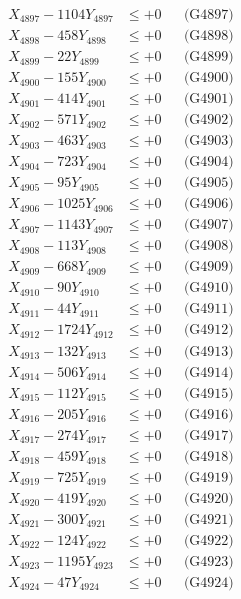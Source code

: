 \documentclass[a4paper,10pt]{article}
\begin{document}
{\begin{align}
X_{4897} - 1104Y_{4897} &\leq +0 && \text{(G4897)} \\
X_{4898} - 458Y_{4898} &\leq +0 && \text{(G4898)} \\
X_{4899} - 22Y_{4899} &\leq +0 && \text{(G4899)} \\
X_{4900} - 155Y_{4900} &\leq +0 && \text{(G4900)} \\
\allowbreak
X_{4901} - 414Y_{4901} &\leq +0 && \text{(G4901)} \\
X_{4902} - 571Y_{4902} &\leq +0 && \text{(G4902)} \\
X_{4903} - 463Y_{4903} &\leq +0 && \text{(G4903)} \\
X_{4904} - 723Y_{4904} &\leq +0 && \text{(G4904)} \\
X_{4905} - 95Y_{4905} &\leq +0 && \text{(G4905)} \\
X_{4906} - 1025Y_{4906} &\leq +0 && \text{(G4906)} \\
X_{4907} - 1143Y_{4907} &\leq +0 && \text{(G4907)} \\
X_{4908} - 113Y_{4908} &\leq +0 && \text{(G4908)} \\
X_{4909} - 668Y_{4909} &\leq +0 && \text{(G4909)} \\
X_{4910} - 90Y_{4910} &\leq +0 && \text{(G4910)} \\
\allowbreak
X_{4911} - 44Y_{4911} &\leq +0 && \text{(G4911)} \\
X_{4912} - 1724Y_{4912} &\leq +0 && \text{(G4912)} \\
X_{4913} - 132Y_{4913} &\leq +0 && \text{(G4913)} \\
X_{4914} - 506Y_{4914} &\leq +0 && \text{(G4914)} \\
X_{4915} - 112Y_{4915} &\leq +0 && \text{(G4915)} \\
X_{4916} - 205Y_{4916} &\leq +0 && \text{(G4916)} \\
X_{4917} - 274Y_{4917} &\leq +0 && \text{(G4917)} \\
X_{4918} - 459Y_{4918} &\leq +0 && \text{(G4918)} \\
X_{4919} - 725Y_{4919} &\leq +0 && \text{(G4919)} \\
X_{4920} - 419Y_{4920} &\leq +0 && \text{(G4920)} \\
\allowbreak
X_{4921} - 300Y_{4921} &\leq +0 && \text{(G4921)} \\
X_{4922} - 124Y_{4922} &\leq +0 && \text{(G4922)} \\
X_{4923} - 1195Y_{4923} &\leq +0 && \text{(G4923)} \\
X_{4924} - 47Y_{4924} &\leq +0 && \text{(G4924)} \\

\end{align}}
\end{document}
